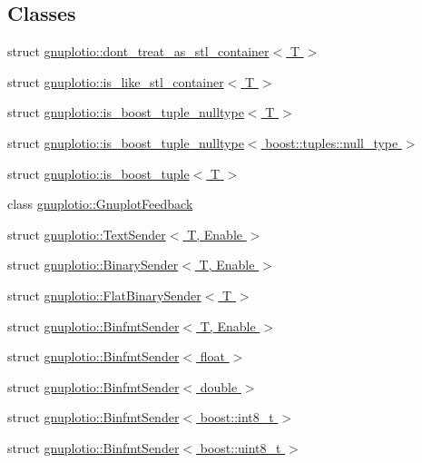 \subsection*{Classes}
\begin{DoxyCompactItemize}
\item 
struct \hyperlink{structgnuplotio_1_1dont__treat__as__stl__container}{gnuplotio\+::dont\+\_\+treat\+\_\+as\+\_\+stl\+\_\+container$<$ T $>$}
\item 
struct \hyperlink{structgnuplotio_1_1is__like__stl__container}{gnuplotio\+::is\+\_\+like\+\_\+stl\+\_\+container$<$ T $>$}
\item 
struct \hyperlink{structgnuplotio_1_1is__boost__tuple__nulltype}{gnuplotio\+::is\+\_\+boost\+\_\+tuple\+\_\+nulltype$<$ T $>$}
\item 
struct \hyperlink{structgnuplotio_1_1is__boost__tuple__nulltype_3_01boost_1_1tuples_1_1null__type_01_4}{gnuplotio\+::is\+\_\+boost\+\_\+tuple\+\_\+nulltype$<$ boost\+::tuples\+::null\+\_\+type $>$}
\item 
struct \hyperlink{structgnuplotio_1_1is__boost__tuple}{gnuplotio\+::is\+\_\+boost\+\_\+tuple$<$ T $>$}
\item 
class \hyperlink{classgnuplotio_1_1_gnuplot_feedback}{gnuplotio\+::\+Gnuplot\+Feedback}
\item 
struct \hyperlink{structgnuplotio_1_1_text_sender}{gnuplotio\+::\+Text\+Sender$<$ T, Enable $>$}
\item 
struct \hyperlink{structgnuplotio_1_1_binary_sender}{gnuplotio\+::\+Binary\+Sender$<$ T, Enable $>$}
\item 
struct \hyperlink{structgnuplotio_1_1_flat_binary_sender}{gnuplotio\+::\+Flat\+Binary\+Sender$<$ T $>$}
\item 
struct \hyperlink{structgnuplotio_1_1_binfmt_sender}{gnuplotio\+::\+Binfmt\+Sender$<$ T, Enable $>$}
\item 
struct \hyperlink{structgnuplotio_1_1_binfmt_sender_3_01float_01_4}{gnuplotio\+::\+Binfmt\+Sender$<$ float $>$}
\item 
struct \hyperlink{structgnuplotio_1_1_binfmt_sender_3_01double_01_4}{gnuplotio\+::\+Binfmt\+Sender$<$ double $>$}
\item 
struct \hyperlink{structgnuplotio_1_1_binfmt_sender_3_01boost_1_1int8__t_01_4}{gnuplotio\+::\+Binfmt\+Sender$<$ boost\+::int8\+\_\+t $>$}
\item 
struct \hyperlink{structgnuplotio_1_1_binfmt_sender_3_01boost_1_1uint8__t_01_4}{gnuplotio\+::\+Binfmt\+Sender$<$ boost\+::uint8\+\_\+t $>$}
\item 

\end{DoxyCompactItemize}
